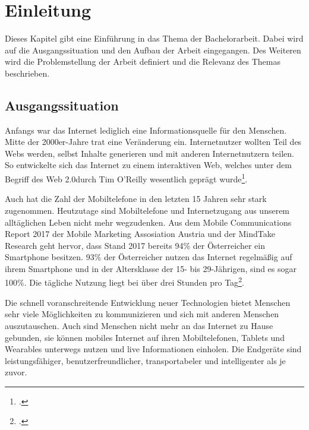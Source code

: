 


\chapter{Einleitung}
\label{ch:Einleitung}
Dieses Kapitel gibt eine Einführung in das Thema der Bachelorarbeit. Dabei wird auf die Ausgangssituation und den Aufbau der Arbeit eingegangen. Des Weiteren wird die Problemstellung der Arbeit definiert und die Relevanz des Themas beschrieben.


\section{Ausgangssituation}

Anfangs war das Internet lediglich eine Informationsquelle für den Menschen. Mitte der 2000er-Jahre trat eine Veränderung ein. Internetnutzer wollten Teil des Webs werden, selbst Inhalte generieren und mit anderen Internetnutzern teilen. So entwickelte sich das Internet zu einem interaktiven Web, welches unter dem Begriff des \glqq Web 2.0\grqq  durch Tim O'Reilly wesentlich geprägt wurde\footcite{oreilly}.

Auch hat die Zahl der Mobiltelefone in den letzten 15 Jahren sehr stark zugenommen.
Heutzutage sind Mobiltelefone und Internetzugang aus unserem alltäglichen Leben nicht mehr wegzudenken. Aus dem Mobile Communications Report 2017 der Mobile Marketing Assosiation Austria und der MindTake Research geht hervor, dass Stand 2017 bereits 94\% der Österreicher ein Smartphone besitzen. 93\% der Österreicher nutzen das Internet regelmäßig auf ihrem Smartphone und in der Altersklasse der 15- bis 29-Jährigen, sind es sogar 100\%. Die tägliche Nutzung liegt bei über drei Stunden pro Tag\footcite{MMAA}.

Die schnell voranschreitende Entwicklung neuer Technologien bietet Menschen sehr viele Möglichkeiten zu kommunizieren und sich mit anderen Menschen auszutauschen. Auch sind Menschen nicht mehr an das Internet zu Hause gebunden, sie können mobiles Internet auf ihren Mobiltelefonen, Tablets und Wearables unterwegs nutzen und live Informationen einholen. Die Endgeräte sind leistungsfähiger, benutzerfreundlicher, transportabeler und intelligenter als je zuvor.

